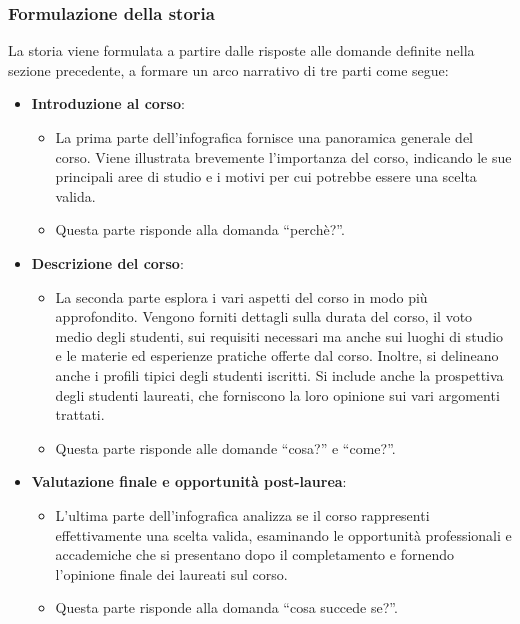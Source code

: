 \subsubsection{Formulazione della storia}\label{subsubsec:app_storia}
La storia viene formulata a partire dalle risposte alle domande definite nella sezione precedente, a formare un arco narrativo di tre parti come segue:
\begin{itemize}
    \item \textbf{Introduzione al corso}:
    \begin{itemize}
        \item La prima parte dell'infografica fornisce una panoramica generale del corso. Viene illustrata brevemente l'importanza del corso, indicando le sue principali aree di studio e 
        i motivi per cui potrebbe essere una scelta valida. 
        \item Questa parte risponde alla domanda ``perchè?''.
    \end{itemize}
    \item \textbf{Descrizione del corso}:
    \begin{itemize}
        \item La seconda parte esplora i vari aspetti del corso in modo più approfondito. Vengono forniti dettagli sulla durata del corso, il voto medio degli studenti, sui requisiti necessari ma anche sui luoghi di studio e 
        le materie ed esperienze pratiche offerte dal corso. Inoltre, si delineano anche i profili tipici degli studenti iscritti.
        Si include anche la prospettiva degli studenti laureati, che forniscono la loro opinione sui vari argomenti trattati.
        \item Questa parte risponde alle domande ``cosa?'' e ``come?''.
    \end{itemize} 
    \item \textbf{Valutazione finale e opportunità post-laurea}:
    \begin{itemize}
        \item L'ultima parte dell'infografica analizza se il corso rappresenti effettivamente una scelta valida, esaminando le opportunità professionali e accademiche che si presentano dopo il completamento e fornendo 
        l'opinione finale dei laureati sul corso.
        \item Questa parte risponde alla domanda ``cosa succede se?''.
    \end{itemize}
\end{itemize}

